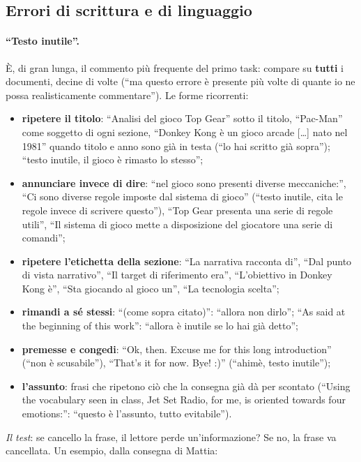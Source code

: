 \subsection{Errori di scrittura e di linguaggio}
\label{rv:t1:sec:linguaggio}

\paragraph{``Testo inutile''.} È, di gran lunga, il commento più frequente
del primo task: compare su \textbf{tutti} i documenti, decine di volte (``ma
questo errore è presente più volte di quante io ne possa realisticamente
commentare''). Le forme ricorrenti:
\begin{itemize}
  \item \textbf{ripetere il titolo}: ``Analisi del gioco Top Gear'' sotto il
        titolo, ``Pac-Man'' come soggetto di ogni sezione, ``Donkey Kong è
        un gioco arcade [\dots] nato nel 1981'' quando titolo e anno sono già
        in testa (``lo hai scritto già sopra''); ``testo inutile, il gioco è
        rimasto lo stesso'';
  \item \textbf{annunciare invece di dire}: ``nel gioco sono presenti diverse
        meccaniche:'', ``Ci sono diverse regole imposte dal sistema di gioco''
        (``testo inutile, cita le regole invece di scrivere questo''),
        ``Top Gear presenta una serie di regole utili'', ``Il sistema di
        gioco mette a disposizione del giocatore una serie di comandi'';
  \item \textbf{ripetere l'etichetta della sezione}: ``La narrativa racconta
        di'', ``Dal punto di vista narrativo'', ``Il target di riferimento
        era'', ``L'obiettivo in Donkey Kong è'', ``Sta giocando al gioco
        un'', ``La tecnologia scelta'';
  \item \textbf{rimandi a sé stessi}: ``(come sopra citato)'': ``allora non
        dirlo''; ``As said at the beginning of this work'': ``allora è inutile
        se lo hai già detto'';
  \item \textbf{premesse e congedi}: ``Ok, then. Excuse me for this long
        introduction'' (``non è scusabile''), ``That's it for now. Bye! :)''
        (``ahimè, testo inutile'');
  \item \textbf{l'assunto}: frasi che ripetono ciò che la consegna già dà per
        scontato (``Using the vocabulary seen in class, Jet Set Radio, for me,
        is oriented towards four emotions:'': ``questo è l'assunto, tutto
        evitabile'').
\end{itemize}
\emph{Il test}: se cancello la frase, il lettore perde un'informazione? Se
no, la frase va cancellata. Un esempio, dalla consegna di Mattia:

